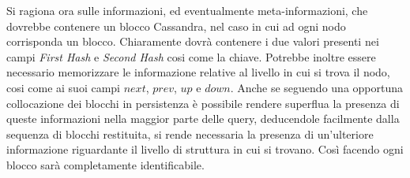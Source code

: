 		Si ragiona ora sulle informazioni, ed eventualmente meta-informazioni, che dovrebbe contenere un blocco Cassandra, nel caso in cui ad ogni nodo corrisponda un blocco. Chiaramente dovrà contenere i due valori presenti nei campi \textit{First Hash} e \textit{Second Hash} cosi come la chiave. Potrebbe inoltre essere necessario memorizzare le informazione relative al livello in cui si trova il nodo, cosi come ai suoi campi $ next $, $ prev $, $ up $ e $ down $. Anche se seguendo una opportuna collocazione dei blocchi in persistenza è possibile rendere superflua la presenza di queste informazioni nella maggior parte delle query, deducendole facilmente dalla sequenza di blocchi restituita, si rende necessaria la presenza di un'ulteriore informazione riguardante il livello di struttura in cui si trovano. Così facendo ogni blocco sarà completamente identificabile.
		
